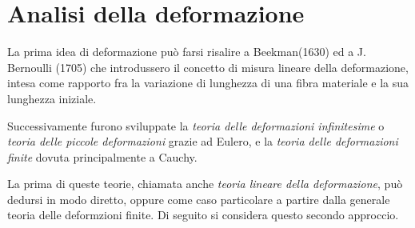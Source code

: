 \chapter{Analisi della deformazione}
La prima idea di deformazione può farsi risalire a Beekman(1630) ed a J. Bernoulli (1705)
che introdussero il concetto di misura lineare della deformazione, intesa come rapporto
fra la variazione di lunghezza di una fibra materiale e la sua lunghezza iniziale.

Successivamente furono sviluppate la \emph{teoria delle deformazioni infinitesime} 
o \emph{teoria delle piccole deformazioni} grazie ad Eulero, e la \emph{teoria delle 
deformazioni finite} dovuta principalmente a Cauchy.

La prima di queste teorie, chiamata anche \emph{teoria lineare della deformazione},
può dedursi in modo diretto, oppure come caso particolare a partire dalla generale
teoria delle deformzioni finite. Di seguito si considera questo secondo approccio.
 

